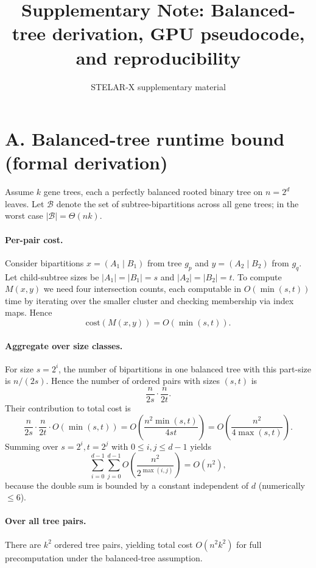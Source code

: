 \documentclass[11pt]{article}
\title{Supplementary Note: Balanced-tree derivation, GPU pseudocode, and reproducibility}
\author{STELAR-X supplementary material}
\date{}
\begin{document}
\maketitle

\section*{A. Balanced-tree runtime bound (formal derivation)}

Assume $k$ gene trees, each a perfectly balanced rooted binary tree on $n=2^d$ leaves.
Let $\mathcal{B}$ denote the set of subtree-bipartitions across all gene trees; in the worst case $|\mathcal{B}|=\Theta(nk)$.

\paragraph{Per-pair cost.}
Consider bipartitions $x=(A_1\mid B_1)$ from tree $g_p$ and $y=(A_2\mid B_2)$ from $g_q$.
Let child-subtree sizes be $|A_1|=|B_1|=s$ and $|A_2|=|B_2|=t$.
To compute $M(x,y)$ we need four intersection counts, each computable in $O(\min(s,t))$ time by iterating over the smaller cluster and checking membership via index maps. Hence
\begin{equation}\label{eq:cost}
\mathrm{cost}(M(x,y)) = O(\min(s,t)).
\end{equation}

\paragraph{Aggregate over size classes.}
For size $s=2^i$, the number of bipartitions in one balanced tree with this part-size is $n/(2s)$.
Hence the number of ordered pairs with sizes $(s,t)$ is
\[
\frac{n}{2s}\cdot\frac{n}{2t}.
\]
Their contribution to total cost is
\[
\frac{n}{2s}\cdot\frac{n}{2t}\cdot O(\min(s,t)) = O\!\left(\frac{n^2\min(s,t)}{4st}\right) = O\!\left(\frac{n^2}{4\max(s,t)}\right).
\]
Summing over $s=2^i, t=2^j$ with $0\le i,j\le d-1$ yields
\[
\sum_{i=0}^{d-1}\sum_{j=0}^{d-1} O\!\left(\frac{n^2}{2^{\max(i,j)}}\right) = O(n^2),
\]
because the double sum is bounded by a constant independent of $d$ (numerically $\le 6$).

\paragraph{Over all tree pairs.}
There are $k^2$ ordered tree pairs, yielding total cost $O(n^2 k^2)$ for full precomputation under the balanced-tree assumption.
\end{document}
